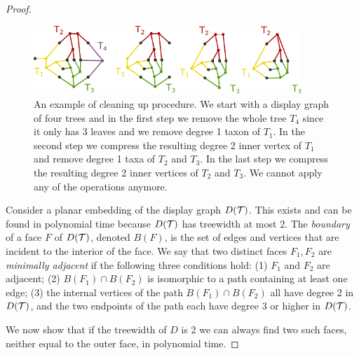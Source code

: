 \begin{proof}
\begin{figure}[h]
	\centering
		\includegraphics[width=0.9\textwidth]{../figs/ch5/clean_up.pdf}
	\caption{An example of cleaning up procedure. We start with a display graph of four trees and in the first step we remove the whole tree $T_4$ since it only has 3 leaves and we remove degree 1 taxon of $T_1$. In the second step we compress the resulting degree 2 inner vertex of $T_1$ and remove degree 1 taxa of $T_2$ and $T_3$. In the last step we compress the resulting degree 2 inner vertices of $T_2$ and $T_3$. We cannot apply any of the operations anymore.}
	\label{fig:clean_up}
\end{figure}


Consider a planar embedding of the display graph $D({\mathcal T})$. This exists and can be found in polynomial time because $D({\mathcal T})$ has treewidth at most 2. The \emph{boundary} of a face $F$ of $D({\mathcal T})$, denoted $B(F)$, is the set of edges and vertices that are incident to the interior of the face. We say that two distinct faces $F_1, F_2$ are \emph{minimally adjacent} if the following three conditions hold: (1) $F_1$ and $F_2$ are adjacent; (2) $B(F_1) \cap B(F_2)$ is isomorphic to a path containing at least one edge; (3) the internal vertices of the path $B(F_1) \cap B(F_2)$ all have degree 2 in $D({\mathcal T})$, and the two endpoints of the path each have degree 3 or higher in $D({\mathcal T})$.

We now show that if the treewidth of $D$ is 2 we can always find two such faces, neither equal to the outer face, in polynomial time. 



\end{proof}

